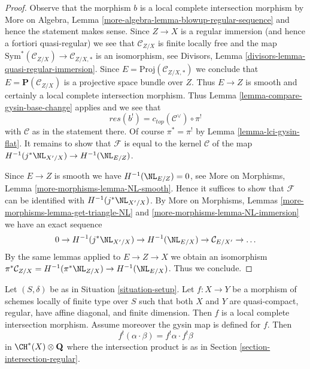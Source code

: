 \begin{proof}
Observe that the morphism $b$ is a local complete intersection morphism
by More on Algebra, Lemma \ref{more-algebra-lemma-blowup-regular-sequence}
and hence the statement makes sense. Since $Z \to X$ is a regular
immersion (and hence a fortiori quasi-regular) we see that $\mathcal{C}_{Z/X}$
is finite locally free and the map
$\text{Sym}^*(\mathcal{C}_{Z/X}) \to \mathcal{C}_{Z/X, *}$
is an isomorphism, see
Divisors, Lemma \ref{divisors-lemma-quasi-regular-immersion}.
Since $E = \text{Proj}(\mathcal{C}_{Z/X, *})$ we conclude
that $E = \mathbf{P}(\mathcal{C}_{Z/X})$
is a projective space bundle over $Z$.
Thus $E \to Z$ is smooth and certainly a local complete intersection
morphism. Thus Lemma \ref{lemma-compare-gysin-base-change}
applies and we see that
$$
res(b^!) = c_{top}(\mathcal{C}^\vee) \circ \pi^!
$$
with $\mathcal{C}$ as in the statement there.
Of course $\pi^* = \pi^!$ by Lemma \ref{lemma-lci-gysin-flat}.
It remains to show that $\mathcal{F}$ is equal to
the kernel $\mathcal{C}$ of the map
$H^{-1}(j^*\NL_{X'/X}) \to H^{-1}(\NL_{E/Z})$.

\medskip\noindent
Since $E \to Z$ is smooth we have $H^{-1}(\NL_{E/Z}) = 0$, see
More on Morphisms, Lemma \ref{more-morphisms-lemma-NL-smooth}.
Hence it suffices to show that $\mathcal{F}$ can be identified
with $H^{-1}(j^*\NL_{X'/X})$. By More on Morphisms, Lemmas
\ref{more-morphisms-lemma-get-triangle-NL} and
\ref{more-morphisms-lemma-NL-immersion} we have an exact sequence
$$
0 \to H^{-1}(j^*\NL_{X'/X}) \to H^{-1}(\NL_{E/X}) \to
\mathcal{C}_{E/X'} \to \ldots
$$
By the same lemmas applied to $E \to Z \to X$ we obtain an isomorphism
$\pi^*\mathcal{C}_{Z/X} = H^{-1}(\pi^*\NL_{Z/X}) \to H^{-1}(\NL_{E/X})$.
Thus we conclude.
\end{proof}

\begin{lemma}
\label{lemma-lci-gysin-product-regular}
Let $(S, \delta)$ be as in Situation \ref{situation-setup}.
Let $f : X \to Y$ be a morphism of schemes locally of finite
type over $S$ such that both $X$ and $Y$ are quasi-compact,
regular, have affine diagonal, and finite dimension.
Then $f$ is a local complete intersection morphism.
Assume moreover the gysin map is defined for $f$. Then
$$
f^!(\alpha \cdot \beta) = f^!\alpha \cdot f^!\beta
$$
in $\CH^*(X) \otimes \mathbf{Q}$ where the intersection product
is as in Section \ref{section-intersection-regular}.
\end{lemma}

